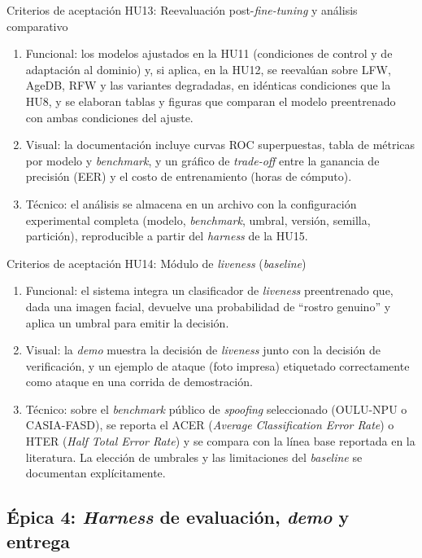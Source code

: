 \documentclass[
  11pt, %
]{charter}
\begin{document}
Criterios de aceptación HU13: Reevaluación post-\textit{fine-tuning} y análisis comparativo
\begin{enumerate}
  \item Funcional: los modelos ajustados en la HU11 (condiciones de control y de adaptación al dominio) y, si aplica, en la HU12, se reevalúan sobre LFW, AgeDB, RFW y las variantes degradadas, en idénticas condiciones que la HU8, y se elaboran tablas y figuras que comparan el modelo preentrenado con ambas condiciones del ajuste.
  \item Visual: la documentación incluye curvas ROC superpuestas, tabla de métricas por modelo y \textit{benchmark}, y un gráfico de \textit{trade-off} entre la ganancia de precisión (EER) y el costo de entrenamiento (horas de cómputo).
  \item Técnico: el análisis se almacena en un archivo con la configuración experimental completa (modelo, \textit{benchmark}, umbral, versión, semilla, partición), reproducible a partir del \textit{harness} de la HU15.
\end{enumerate}

Criterios de aceptación HU14: Módulo de \textit{liveness} (\textit{baseline})
\begin{enumerate}
  \item Funcional: el sistema integra un clasificador de \textit{liveness} preentrenado que, dada una imagen facial, devuelve una probabilidad de ``rostro genuino'' y aplica un umbral para emitir la decisión.
  \item Visual: la \textit{demo} muestra la decisión de \textit{liveness} junto con la decisión de verificación, y un ejemplo de ataque (foto impresa) etiquetado correctamente como ataque en una corrida de demostración.
  \item Técnico: sobre el \textit{benchmark} público de \textit{spoofing} seleccionado (OULU-NPU o CASIA-FASD), se reporta el ACER (\textit{Average Classification Error Rate}) o HTER (\textit{Half Total Error Rate}) y se compara con la línea base reportada en la literatura. La elección de umbrales y las limitaciones del \textit{baseline} se documentan explícitamente.
\end{enumerate}

\subsection{Épica 4: \textit{Harness} de evaluación, \textit{demo} y entrega}
\end{document}
